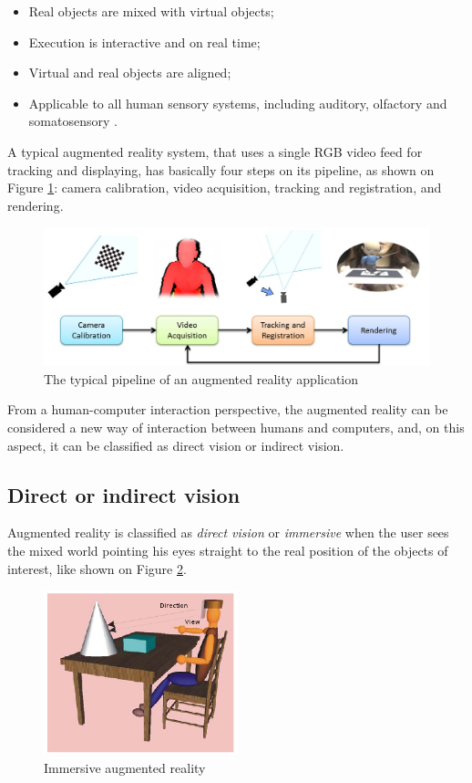 \documentclass[msc, a4paper, classic, en]{ufbathesis}
\begin{document}
\begin{itemize}
  \item Real objects are mixed with virtual objects;
  \item Execution is interactive and on real time;
  \item Virtual and real objects are aligned;
  \item Applicable to all human sensory systems, including auditory, olfactory and somatosensory \cite{azuma01}.
\end{itemize}

A typical augmented reality system, that uses a single RGB video feed for tracking and displaying, has basically four steps on its pipeline, as shown on Figure \ref{fig:arpipeline}: camera calibration, video acquisition, tracking and registration, and rendering.

\begin{figure}
\centering
\includegraphics[width=1\textwidth]{images/arpipeline.png}
\caption{The typical pipeline of an augmented reality application \cite{gallo11}}
\label{fig:arpipeline}
\end{figure}

From a human-computer interaction perspective, the augmented reality can be considered a new way of interaction between humans and computers, and, on this aspect, it can be classified as direct vision or indirect vision.

\subsection{Direct or indirect vision}
\label{sec:dirind}

Augmented reality is classified as \textit{direct vision} or \textit{immersive} when the user sees the mixed world pointing his eyes straight to the real position of the objects of interest, like shown on Figure \ref{fig:direct}.

\begin{figure}
\centering
\includegraphics[width=0.5\textwidth]{images/direct.png}
\caption{Immersive augmented reality \cite{tori2006fundamentos}}
\label{fig:direct}
\end{figure}
\end{document}
